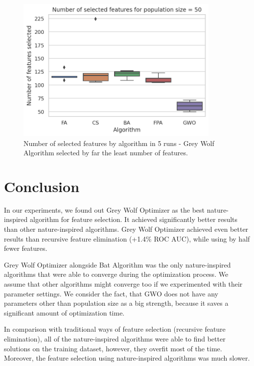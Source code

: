 \documentclass[runningheads]{llncs}
\begin{document}
\begin{figure}[h!]
	\vspace*{1cm}
	\begin{center}
	    \includegraphics[width=10cm]{figures/nia_selected_features_by_algorithm.png}
    \end{center}
	\caption{Number of selected features by algorithm in 5 runs - Grey Wolf Algorithm selected by far the least number of features.}
	\label{fig:nia_selected_features_by_algorithm}
\end{figure}

\newpage

\section{Conclusion}

In our experiments, we found out Grey Wolf Optimizer as the best nature-inspired algorithm for feature selection. It achieved significantly better results than other nature-inspired algorithms. Grey Wolf Optimizer achieved even better results than recursive feature elimination (+1.4\% ROC AUC), while using by half fewer features.

Grey Wolf Optimizer alongside Bat Algorithm was the only nature-inspired algorithms that were able to converge during the optimization process. We assume that other algorithms might converge too if we experimented with their parameter settings. We consider the fact, that GWO does not have any parameters other than population size as a big strength, because it saves a significant amount of optimization time.

In comparison with traditional ways of feature selection (recursive feature elimination), all of the nature-inspired algorithms were able to find better solutions on the training dataset, however, they overfit most of the time. Moreover, the feature selection using nature-inspired algorithms was much slower.



\end{document}
